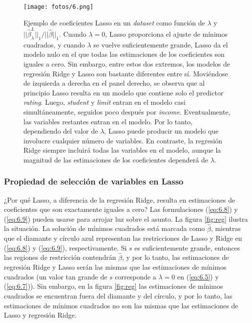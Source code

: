\begin{figure}[h]
\centering
\texttt{[image: fotos/6.png]}
\caption{Ejemplo de coeficientes Lasso en un \textit{dataset} como función de $\lambda$ y $||\hat{\beta}_\lambda^L||_1 / ||\hat{\beta}||_1$. Cuando $\lambda = 0$, Lasso proporciona el ajuste de mínimos cuadrados, y cuando $\lambda$ se vuelve suficientemente grande, Lasso da el modelo nulo en el que todas las estimaciones de los coeficientes son iguales a cero. Sin embargo, entre estos dos extremos, los modelos de regresión Ridge y Lasso son bastante diferentes entre sí. Moviéndose de izquierda a derecha en el panel derecho, se observa que al principio Lasso resulta en un modelo que contiene solo el predictor \textit{rating}. Luego, \textit{student} y \textit{limit} entran en el modelo casi simultáneamente, seguidos poco después por \textit{income}. Eventualmente, las variables restantes entran en el modelo. Por lo tanto, dependiendo del valor de $\lambda$, Lasso puede producir un modelo que involucre cualquier número de variables. En contraste, la regresión Ridge siempre incluirá todas las variables en el modelo, aunque la magnitud de las estimaciones de los coeficientes dependerá de $\lambda$.}
\label{fig:6.6}
\end{figure}

\subsubsection{Propiedad de selección de variables en Lasso}

¿Por qué Lasso, a diferencia de la regresión Ridge, resulta en estimaciones de coeficientes que son exactamente iguales a cero? Las formulaciones (\ref{eq:6.8}) y (\ref{eq:6.9}) pueden usarse para arrojar luz sobre el asunto. La figura \ref{fig:reg} ilustra la situación. La solución de mínimos cuadrados está marcada como $\hat{\beta}$, mientras que el diamante y círculo azul representan las restricciones de Lasso y Ridge en (\ref{eq:6.8}) y (\ref{eq:6.9}), respectivamente. Si $s$ es suficientemente grande, entonces las regiones de restricción contendrán $\hat{\beta}$, y por lo tanto, las estimaciones de regresión Ridge y Lasso serán las mismas que las estimaciones de mínimos cuadrados (un valor tan grande de $s$ corresponde a $\lambda = 0$ en (\ref{eq:6.5}) y (\ref{eq:6.7})). Sin embargo, en la figura \ref{fig:reg} las estimaciones de mínimos cuadrados se encuentran fuera del diamante y del círculo, y por lo tanto, las estimaciones de mínimos cuadrados no son las mismas que las estimaciones de Lasso y regresión Ridge. \\

